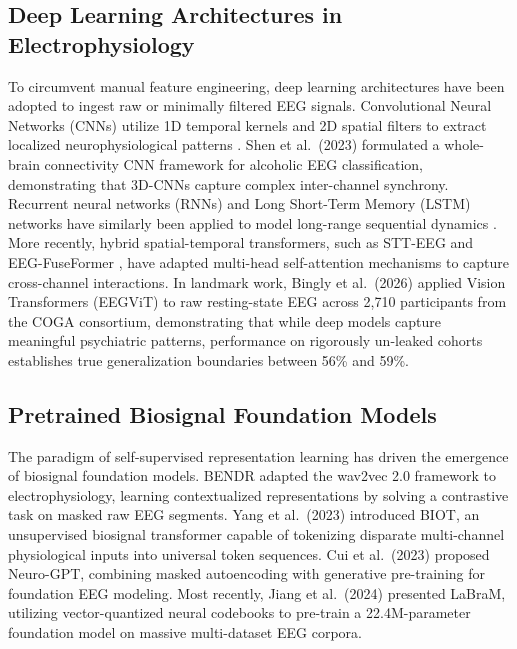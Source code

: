 \documentclass[11pt,a4paper]{article}
\begin{document}
\subsection{Deep Learning Architectures in Electrophysiology}
To circumvent manual feature engineering, deep learning architectures have been adopted to ingest raw or minimally filtered EEG signals. Convolutional Neural Networks (CNNs) utilize 1D temporal kernels and 2D spatial filters to extract localized neurophysiological patterns \cite{schirrmeister2017,roy2019chrononet}. Shen et al.\ (2023) \cite{shen2023bspc} formulated a whole-brain connectivity CNN framework for alcoholic EEG classification, demonstrating that 3D-CNNs capture complex inter-channel synchrony. Recurrent neural networks (RNNs) and Long Short-Term Memory (LSTM) networks have similarly been applied to model long-range sequential dynamics \cite{roy2019chrononet}. More recently, hybrid spatial-temporal transformers, such as STT-EEG \cite{stteeg2026} and EEG-FuseFormer \cite{hariharan2026eegfuseformer}, have adapted multi-head self-attention mechanisms to capture cross-channel interactions. In landmark work, Bingly et al.\ (2026) \cite{bingly2026coga} applied Vision Transformers (EEGViT) to raw resting-state EEG across 2,710 participants from the COGA consortium, demonstrating that while deep models capture meaningful psychiatric patterns, performance on rigorously un-leaked cohorts establishes true generalization boundaries between 56\% and 59\%.

\subsection{Pretrained Biosignal Foundation Models}
The paradigm of self-supervised representation learning has driven the emergence of biosignal foundation models. BENDR \cite{kostas2021bendr} adapted the wav2vec 2.0 framework to electrophysiology, learning contextualized representations by solving a contrastive task on masked raw EEG segments. Yang et al.\ (2023) \cite{yang2023biot} introduced BIOT, an unsupervised biosignal transformer capable of tokenizing disparate multi-channel physiological inputs into universal token sequences. Cui et al.\ (2023) \cite{cui2023neurogpt} proposed Neuro-GPT, combining masked autoencoding with generative pre-training for foundation EEG modeling. Most recently, Jiang et al.\ (2024) \cite{jiang2024labram} presented LaBraM, utilizing vector-quantized neural codebooks to pre-train a 22.4M-parameter foundation model on massive multi-dataset EEG corpora.
\end{document}
